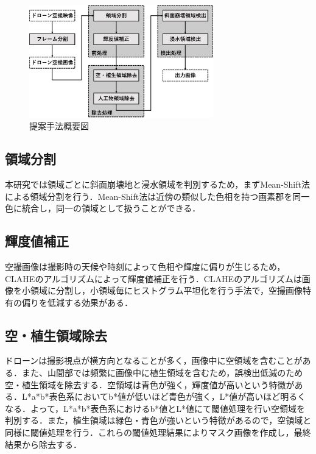 \documentclass[a4paper, twocolumn, xelatex, 10pt, ja=standard, Ligatures=TeX]{bxjsarticle}
\begin{document}
		\begin{figure}[t] %
			\centering
			\includegraphics[width=8cm]{img/howto3.jpg}
			\caption{提案手法概要図}
			\label{img01}
		\end{figure}

		\subsection{領域分割}
            本研究では領域ごとに斜面崩壊地と浸水領域を判別するため，まずMean-Shift法による領域分割を行う．Mean-Shift法は近傍の類似した色相を持つ画素郡を同一色に統合し，同一の領域として扱うことができる．

        \subsection{輝度値補正}
            空撮画像は撮影時の天候や時刻によって色相や輝度に偏りが生じるため，CLAHEのアルゴリズム\cite{art05}によって輝度値補正を行う．CLAHEのアルゴリズムは画像を小領域に分割し，小領域毎にヒストグラム平坦化を行う手法で，空撮画像特有の偏りを低減する効果がある．
			
		\subsection{空・植生領域除去}
			ドローンは撮影視点が横方向となることが多く，画像中に空領域を含むことがある．また、山間部では頻繁に画像中に植生領域を含むため，誤検出低減のため空・植生領域を除去する．空領域は青色が強く，輝度値が高いという特徴がある．L*a*b*表色系においてb*値が低いほど青色が強く，L*値が高いほど明るくなる．よって，L*a*b*表色系におけるb*値とL*値にて閾値処理を行い空領域を判別する．また，植生領域は緑色・青色が強いという特徴があるので，空領域と同様に閾値処理を行う．これらの閾値処理結果によりマスク画像を作成し，最終結果から除去する．
\end{document}
